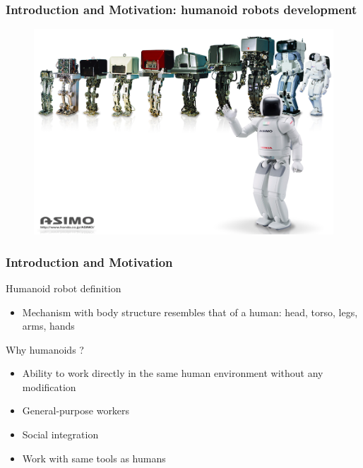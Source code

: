 \documentclass{beamer}
\begin{document}

	\begin{frame}
		\frametitle{Introduction and Motivation: humanoid robots development}
		\begin{figure}[h!]
			\includegraphics[width=\linewidth]{presentation_images/6}
		\end{figure}
	\end{frame}
	

	\begin{frame}
		\frametitle{Introduction and Motivation}
		\begin{block}{Humanoid robot definition}
			\begin{itemize}
				\item
					Mechanism with body structure resembles that of a human: head, torso, legs, arms, hands \cite{hirai1998development}
			\end{itemize}
		\end{block}
		\begin{block}{Why humanoids ?}
			\begin{itemize}
				\item
					Ability to work directly in the same human environment without any modification
				\item
					General-purpose workers
				\item
					Social integration
				\item
					Work with same tools as humans
			\end{itemize}
		\end{block}
	\end{frame}
	
\end{document}
